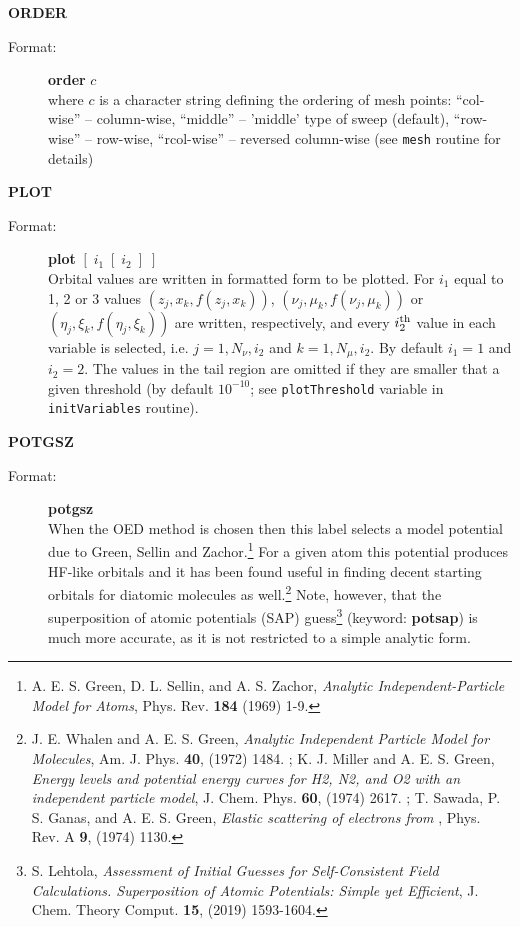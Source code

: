 \documentclass[10pt,a4paper]{article}
\newcommand{\ft}[1]{\texttt{#1}}
\begin{document}
\begin{description}
\item \textbf{ORDER}
\begin{description}
\item[Format:] \textbf{order} $c$\\
  where $c$ is a character string defining the ordering of mesh points:
  ``col-wise'' -- column-wise, ``middle'' -- 'middle' type of sweep
  (default), ``row-wise'' -- row-wise, ``rcol-wise'' -- reversed
  column-wise (see \ft{mesh} routine for details)
\end{description}

\item \textbf{PLOT}
\begin{description}
\item[Format:] \textbf{plot} $[\;i_1\;[\;i_2\;]\;]$\\
  Orbital values are written in formatted form to be plotted.  For $i_1$
  equal to 1, 2 or 3 values $(z_j,x_k,f(z_j,x_k))$,
  $(\nu_j,\mu_k,f(\nu_j,\mu_k))$ or $(\eta_j,\xi_k,f(\eta_j,\xi_k))$ are
  written, respectively, and every $i_2^{\rm th}$ value in each variable is
  selected, i.e. $j=1,N_{\nu},i_2$ and $k=1,N_{\mu},i_2$. By default $i_1=1$
  and $i_2=2$. The values in the tail region are omitted if they are
  smaller that a given threshold (by default $10^{-10}$; see
  \texttt{plotThreshold} variable in \texttt{initVariables} routine).

\end{description}


\item \textbf{POTGSZ}
\begin{description}
\item[Format:] \textbf{potgsz} \\ When the OED method is chosen then
  this label selects a model potential due to Green, Sellin and
  Zachor.\footnote{A. E. S. Green, D. L. Sellin, and A. S. Zachor,
    \textsl{Analytic Independent-Particle Model for Atoms},
    Phys. Rev. \textbf{184} (1969) 1-9. }
  For a given atom this potential produces HF-like orbitals and it has
  been found useful in finding decent starting orbitals for diatomic
  molecules as well.\footnote{J. E. Whalen and A. E. S. Green,
    \textsl{Analytic Independent Particle Model for Molecules},
    Am. J. Phys. \textbf{40}, (1972) 1484. ;
    K. J. Miller and A. E. S. Green, \textsl{Energy levels and
      potential energy curves for H2, N2, and O2 with an independent
      particle model}, J. Chem. Phys. \textbf{60}, (1974)
    2617. ; T. Sawada, P. S. Ganas, and
    A. E. S. Green, \textsl{Elastic scattering of electrons from
      }, Phys. Rev. A \textbf{9}, (1974)
    1130. } Note, however, that the
  superposition of atomic potentials (SAP) guess\footnote{S. Lehtola,
    \textsl{Assessment of Initial Guesses for Self-Consistent Field
      Calculations. Superposition of Atomic Potentials: Simple yet
      Efficient}, J. Chem. Theory Comput. \textbf{15}, (2019)
    1593-1604. } (keyword:
  \textbf{potsap}) is much more accurate, as it is not restricted to a
  simple analytic form.
\end{description}



\end{description}
\end{document}
